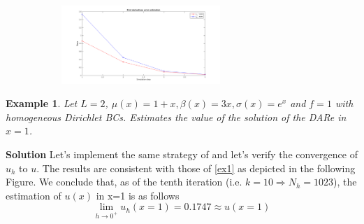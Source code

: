 \documentclass[12pt,openany,twoside,a4paper]{article}
\newtheorem{exmp}{Example}
\begin{document}
\begin{figure}[H]
\begin{subfigure}[h]{0.3\textwidth}
    \end{subfigure}
     ~ \;
     \begin{subfigure}[h]{0.3\textwidth}
        \includegraphics[keepaspectratio,width=6cm]{cospix_error.png}
    \end{subfigure}
    \captionsetup{singlelinecheck=off}
\end{figure}
\newpage
\begin{exmp}\label{ex2}
Let $L=2$, $\mu(x)=1+x, \beta(x)=3x, \sigma(x)=e^x$ and $f=1$ with homogeneous Dirichlet BCs. Estimates the value of the solution of the DARe in $x=1$.
\end{exmp}
\textbf{Solution}
\newline Let's implement the same strategy of \label{ex1} and let's verify the convergence of $u_h$ to $u$. The results are consistent with those of \ref{ex1} as depicted in the following Figure. 
\newline
We conclude that, as of the tenth iteration (i.e. $k=10\Rightarrow N_h=1023$), the estimation of $u(x)$ in x=1 is as follows
\begin{equation*}
    \lim_{h\to0^+}u_h(x=1)=0.1747\approx u(x=1)
\end{equation*}
\end{document}
